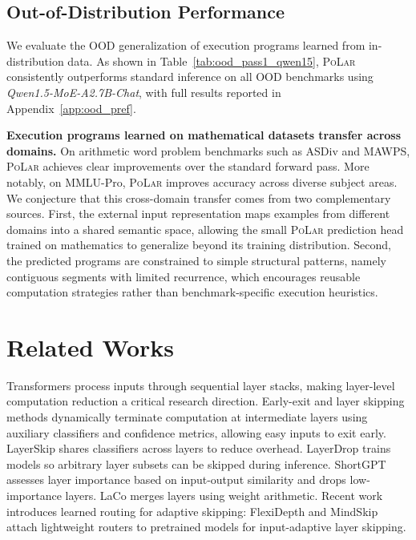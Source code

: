 \documentclass{article}
\theoremstyle{plain}
\theoremstyle{definition}
\theoremstyle{remark}
\newcommand\ours{\textsc{PoLar}\xspace}
\begin{document}
\subsection{Out-of-Distribution Performance}

We evaluate the OOD generalization of execution programs learned from in-distribution data.
As shown in Table~\ref{tab:ood_pass1_qwen15}, \ours consistently outperforms standard inference on all OOD benchmarks using \textit{Qwen1.5-MoE-A2.7B-Chat}, with full results reported in Appendix~\ref{app:ood_pref}.


\textbf{Execution programs learned on mathematical datasets transfer across domains.}
On arithmetic word problem benchmarks such as ASDiv and MAWPS, \ours achieves clear improvements over the standard forward pass.
More notably, on MMLU-Pro, \ours improves accuracy across diverse subject areas.
We conjecture that this cross-domain transfer comes from two complementary
sources. First, the external input representation maps examples from different
domains into a shared semantic space, allowing the small \ours prediction head
trained on mathematics to generalize beyond its training distribution. Second,
the predicted programs are constrained to simple structural patterns, namely
contiguous segments with limited recurrence, which encourages reusable
computation strategies rather than benchmark-specific execution heuristics.










\section{Related Works}

Transformers process inputs through sequential layer stacks, making layer-level computation reduction a critical research direction. Early-exit and layer skipping methods \cite{liu2020fastbert,xin2020deebert,zhou2020bert,liu2021faster} dynamically terminate computation at intermediate layers using auxiliary classifiers and confidence metrics, allowing easy inputs to exit early. LayerSkip \cite{elhoushi2024layerskip} shares classifiers across layers to reduce overhead. LayerDrop \cite{fan2019reducing} trains models so arbitrary layer subsets can be skipped during inference. ShortGPT \cite{men2025shortgpt} assesses layer importance based on input-output similarity and drops low-importance layers. LaCo \cite{yang2024laco} merges layers using weight arithmetic. Recent work introduces learned routing for adaptive skipping: FlexiDepth \cite{luo2025adaptive} and MindSkip \cite{he2024router} attach lightweight routers to pretrained models for input-adaptive layer skipping.
\end{document}
